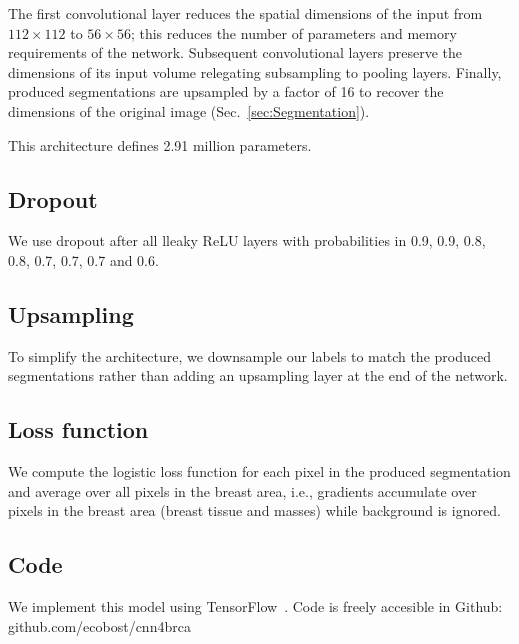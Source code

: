 	The first convolutional layer reduces the spatial dimensions of the input from $112 \times 112$ to $56 \times 56$; this reduces the number of parameters and memory requirements of the network. Subsequent convolutional layers preserve the dimensions of its input volume relegating subsampling to pooling layers.
Finally, produced segmentations are upsampled by a factor of 16 to recover the dimensions of the original image (Sec.~\ref{sec:Segmentation}).

This architecture defines 2.91 million parameters. %



\subsection{Dropout}
We use dropout after all lleaky ReLU layers with probabilities in 0.9, 0.9, 0.8, 0.8, 0.7, 0.7, 0.7 and 0.6.

\subsection{Upsampling}
To simplify the architecture, we downsample our labels to match the produced segmentations rather than adding an upsampling layer at the end of the network.

\subsection{Loss function}
We compute the logistic loss function for each pixel in the produced segmentation and average over all pixels in the breast area, i.e., gradients accumulate over pixels in the breast area (breast tissue and masses) while background is ignored.

\subsection{Code}
We implement this model using TensorFlow~\cite{abadi2014}. Code is freely accesible in Github: github.com/ecobost/cnn4brca
